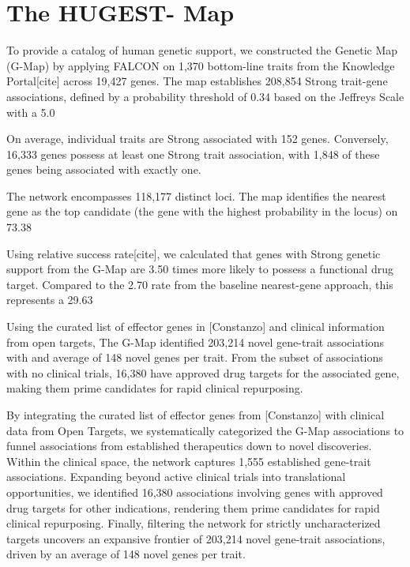 \section{The HUGEST- Map}
\label{sec:map}
To provide a catalog of human genetic support, we constructed the Genetic Map (G-Map) by applying FALCON on 1,370 bottom-line traits from the Knowledge Portal[cite] across 19,427 genes. The map establishes 208,854 Strong trait-gene associations, defined by a probability threshold of 0.34 based on the Jeffreys Scale with a 5.0%

On average, individual traits are Strong associated with 152 genes. Conversely, 16,333 genes possess at least one Strong trait association, with 1,848 of these genes being associated with exactly one.

The network encompasses 118,177 distinct loci. The map identifies the nearest gene as the top candidate (the gene with the highest probability in the locus) on 73.38%

Using relative success rate[cite], we calculated that genes with Strong genetic support from the G-Map are 3.50 times more likely to possess a functional drug target. Compared to the 2.70 rate from the baseline nearest-gene approach, this represents a 29.63%

Using the curated list of effector genes in [Constanzo] and clinical information from open targets, The G-Map identified 203,214 novel gene-trait associations with and average of 148 novel genes per trait. From the subset of associations with no clinical trials, 16,380 have approved drug targets for the associated gene, making them prime candidates for rapid clinical repurposing.

By integrating the curated list of effector genes from [Constanzo] with clinical data from Open Targets, we systematically categorized the G-Map associations to funnel associations from established therapeutics down to novel discoveries. Within the clinical space, the network captures 1,555 established gene-trait associations. Expanding beyond active clinical trials into translational opportunities, we identified 16,380 associations involving genes with approved drug targets for other indications, rendering them prime candidates for rapid clinical repurposing. Finally, filtering the network for strictly uncharacterized targets uncovers an expansive frontier of 203,214 novel gene-trait associations, driven by an average of 148 novel genes per trait.
